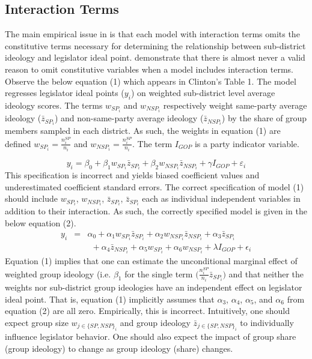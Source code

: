 \documentclass[10pt,letterpaper]{article}
\begin{document}
\subsection{Interaction Terms}
The main empirical issue in \citep{Clinton2006} is that each model with interaction terms omits the constitutive terms necessary for determining the relationship between sub-district ideology and legislator ideal point. \cite{Brambor2006} demonstrate that there is almost never a valid reason to omit constitutive variables when a model includes interaction terms. Observe the below equation (1) which appears in Clinton's Table 1. The model regresses legislator ideal points ($y_i$) on weighted sub-district level average ideology scores. The terms $w_{SP_i}$ and $w_{NSP_i}$ respectively weight same-party average ideology ($\bar{z}_{SP_i}$) and non-same-party average ideology ($\bar{z}_{NSP_i}$) by the share of group members sampled in each district. As such, the weights in equation (1) are defined $w_{SP_i} = \frac{n_i^{SP}}{n_i}$ and $w_{NSP_i} =  \frac{n_i^{SP}}{n_i}$. The term $I_{GOP}$ is a party indicator variable. 

\begin{equation}
y_i  = \beta_0 + \beta_1 w_{SP_i} \bar{z}_{SP_i} + \beta_2 w_{NSP_i} \bar{z}_{NSP_i} + \gamma I_{GOP} + \varepsilon_i
\end{equation}
This specification is incorrect and yields biased coefficient values and underestimated coefficient standard errors. The correct specification of model (1) should include $w_{SP_i}$, $w_{NSP_i}$, $\bar{z}_{SP_i}$, $\bar{z}_{SP_i}$ each as individual independent variables in addition to their interaction. As such, the correctly specified model is given in the below equation (2).
\begin{equation}
\begin{array}{ccc}
y_i & = & \alpha_0 + \alpha_1 w_{SP_i} \bar{z}_{SP_i} + \alpha_2 w_{NSP_i} \bar{z}_{NSP_i} + \alpha_3 \bar{z}_{SP_i}~~~~~~~~~\\ 
& & ~~+ \alpha_4 \bar{z}_{NSP_i} + \alpha_5 w_{SP_i} + \alpha_6 w_{NSP_i} + \lambda I_{GOP} + \epsilon_i
\end{array}
\end{equation}
Equation (1) implies that one can estimate the unconditional marginal effect of weighted group ideology (i.e. $\beta_1$ for the single term $\big( \frac{n_i^{SP}}{n_i} \bar{z}_{SP_i}\big)$ and that neither the weights nor sub-district group ideologies have an independent effect on legislator ideal point. That is, equation (1) implicitly assumes that $\alpha_3$, $\alpha_4$, $\alpha_5$, and $\alpha_6$ from equation (2) are all zero. Empirically, this is incorrect. Intuitively, one should expect group size $w_{j\in \{SP,NSP\}_i}$ and group ideology $\bar{z}_{j\in \{SP,NSP\}_i}$ to individually influence legislator behavior. One should also expect the impact of group share (group ideology) to change as group ideology (share) changes.
\end{document}

